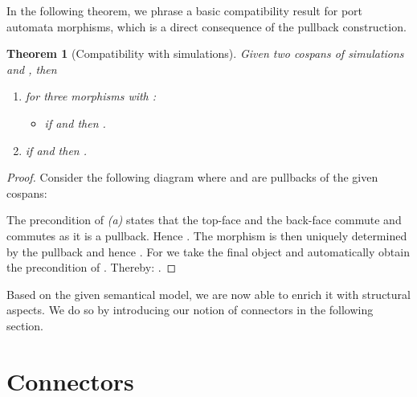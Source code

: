 \documentclass[copyright,creativecommons]{eptcs}
\newtheorem{theorem}{Theorem}
\begin{document}
In the following theorem, we phrase a basic compatibility result for port
automata morphisms, which is a direct consequence of the pullback construction.
\begin{theorem}[Compatibility with simulations]
Given two cospans of simulations  and 
,
then
\begin{enumerate}
  \item for three morphisms  with :
  \vspace{2mm}
  \begin{itemize} 
    \item if  and  then .
  \end{itemize} 
  \vspace{2mm}
  \item if  and  then 
  .
\end{enumerate}
\end{theorem}
\begin{proof}
Consider the following diagram where  and  are pullbacks of the given
cospans:
\vspace{-3mm}

The precondition of \emph{(a)} states that the top-face and the back-face 
commute and  commutes as it is a pullback. Hence . The morphism  is then
uniquely determined by the pullback  and hence . 
For  we take  the final object and automatically obtain
the precondition of . Thereby:
.
\end{proof}

Based on the given semantical model, we are now able to enrich it
with structural aspects. We do so by introducing our notion of 
connectors in the following section.

 

\section{Connectors}
\label{sec:connectors}
\end{document}
